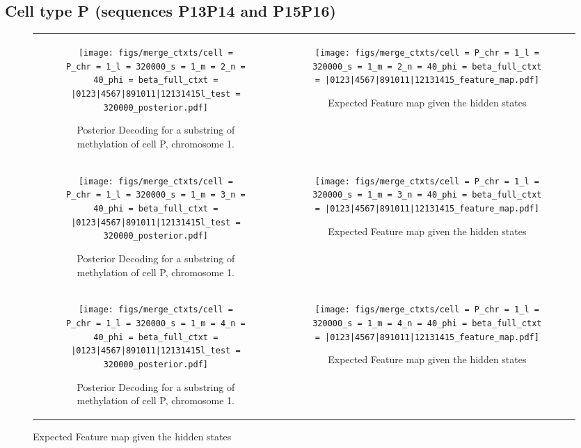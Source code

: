 \documentclass{article}
\begin{document}
\subsection{Cell type P (sequences P13P14 and P15P16)}
\begin{figure}[H]
    \begin{tabular}{cc}
      \begin{subfigure}[t]{0.4\textwidth}
        \texttt{[image: figs/merge\_ctxts/cell = P\_chr = 1\_l = 320000\_s = 1\_m = 2\_n = 40\_phi = beta\_full\_ctxt = |0123|4567|891011|12131415l\_test = 320000\_posterior.pdf]}
        \caption{Posterior Decoding for a substring of methylation of cell P, chromosome 1.}
      \end{subfigure}
      &
      \begin{subfigure}[t]{0.6\textwidth}
        \texttt{[image: figs/merge\_ctxts/cell = P\_chr = 1\_l = 320000\_s = 1\_m = 2\_n = 40\_phi = beta\_full\_ctxt = |0123|4567|891011|12131415\_feature\_map.pdf]}
        \caption{Expected Feature map given the hidden states}
      \end{subfigure}
      \\
      \begin{subfigure}[t]{0.4\textwidth}
        \texttt{[image: figs/merge\_ctxts/cell = P\_chr = 1\_l = 320000\_s = 1\_m = 3\_n = 40\_phi = beta\_full\_ctxt = |0123|4567|891011|12131415l\_test = 320000\_posterior.pdf]}
        \caption{Posterior Decoding for a substring of methylation of cell P, chromosome 1.}
      \end{subfigure}
      &
      \begin{subfigure}[t]{0.6\textwidth}
        \texttt{[image: figs/merge\_ctxts/cell = P\_chr = 1\_l = 320000\_s = 1\_m = 3\_n = 40\_phi = beta\_full\_ctxt = |0123|4567|891011|12131415\_feature\_map.pdf]}
        \caption{Expected Feature map given the hidden states}
      \end{subfigure}
      \\
      \begin{subfigure}[t]{0.4\textwidth}
        \texttt{[image: figs/merge\_ctxts/cell = P\_chr = 1\_l = 320000\_s = 1\_m = 4\_n = 40\_phi = beta\_full\_ctxt = |0123|4567|891011|12131415l\_test = 320000\_posterior.pdf]}
        \caption{Posterior Decoding for a substring of methylation of cell P, chromosome 1.}
      \end{subfigure}
      &
      \begin{subfigure}[t]{0.6\textwidth}
        \texttt{[image: figs/merge\_ctxts/cell = P\_chr = 1\_l = 320000\_s = 1\_m = 4\_n = 40\_phi = beta\_full\_ctxt = |0123|4567|891011|12131415\_feature\_map.pdf]}
        \caption{Expected Feature map given the hidden states}
      \end{subfigure}
  \end{tabular}
\end{figure}
\end{document}
